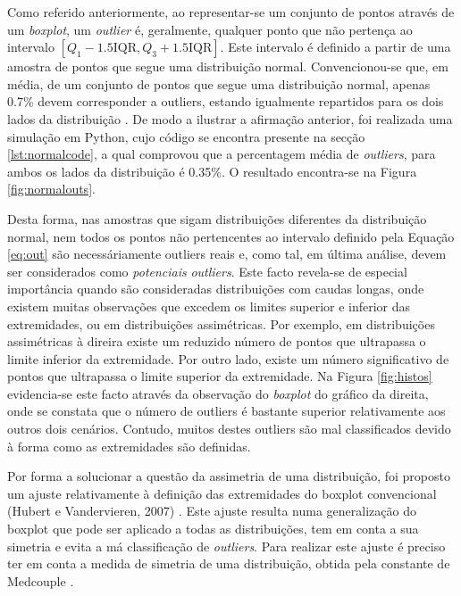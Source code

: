 Como referido anteriormente, ao representar-se um conjunto de pontos através de um \textit{boxplot}, um \textit{outlier} é, geralmente, qualquer ponto que não pertença ao intervalo $\left[Q_1 - 1.5\text{IQR}, Q_3 + 1.5 \text{IQR} \right]$. Este intervalo é definido a partir de uma amostra de pontos que segue uma distribuição normal. 
Convencionou-se que, em média, de um conjunto de pontos que segue uma distribuição normal, apenas 0.7\% devem corresponder a outliers, estando igualmente repartidos para os dois lados da distribuição \cite{hoaglin1983understanding}. De modo a ilustrar a afirmação anterior, foi realizada uma simulação em Python, cujo código se encontra presente na secção \ref{lst:normalcode}, a qual comprovou que a percentagem média de \textit{outliers}, para ambos os lados da distribuição é 0.35\%. O resultado encontra-se na Figura \ref{fig:normalouts}. 

Desta forma, nas amostras que sigam distribuições diferentes da distribuição normal, nem todos os pontos não pertencentes ao intervalo definido pela Equação \ref{eq:out} são necessáriamente outliers reais \cite{hoaglin1983understanding} e, como tal, em última análise, devem ser considerados como \textit{potenciais} \textit{outliers}. Este facto revela-se de especial importância quando são consideradas distribuições com caudas longas, onde existem muitas observações que excedem os limites superior e inferior das extremidades, ou em distribuições assimétricas. Por exemplo, em distribuições assimétricas à direira existe um reduzido número de pontos que ultrapassa o limite inferior da extremidade. Por outro lado, existe um número significativo de pontos que ultrapassa o limite superior da extremidade. Na Figura \ref{fig:histos} evidencia-se este facto através da observação do \textit{boxplot} do gráfico da direita, onde se constata que o número de outliers é bastante superior relativamente aos outros dois cenários. Contudo, muitos destes outliers são mal classificados devido à forma como as extremidades são definidas. 

Por forma a solucionar a questão da assimetria de uma distribuição, foi proposto um ajuste relativamente à definição das extremidades do boxplot convencional (Hubert e Vandervieren, 2007) \cite{hoaglin1983understanding}. Este ajuste resulta numa generalização do boxplot que pode ser aplicado a todas as distribuições, tem em conta a sua simetria e evita a má classificação de \textit{outliers}. Para realizar este ajuste é preciso ter em conta a medida de simetria de uma distribuição, obtida pela constante de Medcouple \cite{mc}. 

